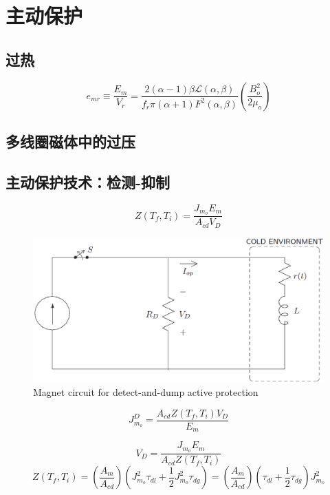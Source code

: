 \section{主动保护}
\subsection{过热}
\begin{equation}%
e_{mr}\equiv\frac{E_m}{V_r}=\frac{2(\alpha-1)\beta\mathcal{L}(\alpha,\beta)}{f_r\pi(\alpha+1)F^2(\alpha,\beta)}\left(\frac{B_{o}^{2}}{2\mu_o}\right)
\end{equation}


\subsection{多线圈磁体中的过压}


\subsection{主动保护技术：检测-抑制}

\begin{equation}%
Z(T_f,T_i)=\frac{J_{m_o}E_m}{A_{cd}V_D}
\end{equation}

\begin{figure}
	\centering
	\includegraphics[scale=0.6]{chpt8/figs/fig8.17.eps}
	\caption{Magnet circuit for detect-and-dump active protection}
\end{figure}



\begin{equation}%
J_{m_o}^{D}=\frac{A_{cd}Z(T_f,T_i)V_D}{E_m}
\end{equation}



\begin{equation}%
V_D=\frac{J_{m_o}E_m}{A_{cd}Z(T_f,T_i)}
\end{equation}
\begin{equation}%
Z(T_f,T_i)=\left(\frac{A_m}{A_{cd}}\right)(J_{m_o}^{2}\tau_{dl}+\frac{1}{2}J_{m_o}^{2}\tau_{dg})
=\left(\frac{A_m}{A_{cd}}\right)(\tau_{dl}+\frac{1}{2}\tau_{dg})J_{m_o}^{2}
\end{equation}







